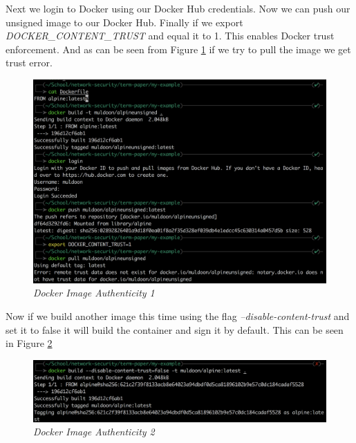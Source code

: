 Next we login to Docker using our Docker Hub credentials. Now we can push our unsigned image to our Docker Hub. Finally if we export \textit{DOCKER\_CONTENT\_TRUST} and equal it to 1. This enables Docker trust enforcement. And as can be seen from Figure \ref{img:demo8} if we try to pull the image we get trust error.
\begin{figure}[!ht]
\centering
\includegraphics*[width=\textwidth]{images/term8.png}
\caption{\em Docker Image Authenticity 1}
\label{img:demo8}
\end{figure}
\newpage
Now if we build another image this time using the flag \textit{--disable-content-trust} and set it to false it will build the container and sign it by default. This can be seen in Figure \ref{img:demo9}
\begin{figure}[!ht]
\centering
\includegraphics*[width=\textwidth]{images/term9.png}
\caption{\em Docker Image Authenticity 2}
\label{img:demo9}
\end{figure}

